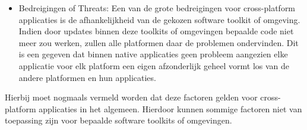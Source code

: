 \begin{itemize}
    \item Bedreigingen of Threats:
    Een van de grote bedreigingen voor cross-platform applicaties is de afhankelijkheid van de gekozen software toolkit of omgeving. Indien door updates binnen deze toolkits of omgevingen bepaalde code niet meer zou werken, zullen alle platformen daar de problemen ondervinden. Dit is een gegeven dat binnen native applicaties geen probleem aangezien elke applicatie voor elk platform een eigen afzonderlijk geheel vormt los van de andere platformen en hun applicaties. 
\end{itemize}

Hierbij moet nogmaals vermeld worden dat deze factoren gelden voor cross-platform applicaties in het algemeen. Hierdoor kunnen sommige factoren niet van toepassing zijn voor bepaalde software toolkits of omgevingen. 


\section{}
\label{sec:SVZmultiplatform}



\subsection{}
\label{sec:SVZKM}


